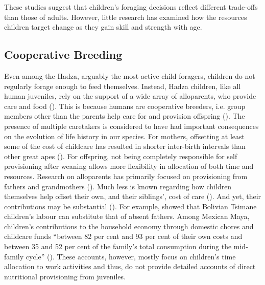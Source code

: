 These studies suggest that children’s foraging decisions reflect different trade-offs than those of adults. However, little research has examined how the resources children target change as they gain skill and strength with age.

\subsection{Cooperative Breeding}
Even among the Hadza, arguably the most active child foragers, children do not regularly forage enough to feed themselves. Instead, Hadza children, like all human juveniles, rely on the support of a wide array of alloparents, who provide care and food (\cite{crittenden_allomaternal_2008}). This is because humans are cooperative breeders, i.e. group members other than the parents help care for and provision offspring (\cite{hrdy_evolutionary_2006}). The presence of multiple caretakers is considered to have had important consequences on the evolution of life history in our species. 
For mothers, offsetting at least some of the cost of childcare has resulted in shorter inter-birth intervals than other great apes (\cite{ meehan_cooperative_2013}). For offspring, not being completely responsible for self provisioning after weaning allows more flexibility in allocation of both time and resources.
Research on alloparents has primarily focused on provisioning from fathers and grandmothers (\cite{hawkes_hadza_1997, gibson_helpful_2005, sear_effects_2002}). Much less is known regarding how children themselves help offset their own, and their siblings’, cost of care (\cite{reiches_pooled_2009, kramer_early_2009, kramer_pooled_2010}). And yet, their contributions may be substantial (\cite{cain_economic_1977}).
For example, \cite{stieglitz_household_2013} showed that Bolivian Tsimane children’s labour can substitute that of absent fathers. Among Mexican Maya, children’s contributions to the household economy through domestic chores and childcare funds “between 82 per cent and 93 per cent of their own costs and between 35 and 52 per cent of the family’s total consumption during the mid-family cycle” (\cite{kramer_variation_2002, kramer_maya_2005, kramer_childrens_2005, kramer_does_2009}). These accounts, however, mostly focus on children’s time allocation to work activities and thus, do not provide detailed accounts of direct nutritional provisioning from juveniles.






